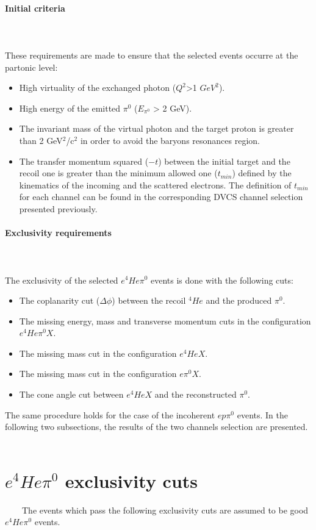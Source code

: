 \paragraph{Initial criteria}
~\\
~\\
These requirements are made to ensure that the selected events occurre at the partonic level:
\begin{itemize}
\item High virtuality of the exchanged photon ($Q^{2}$>1 $GeV^{2}$).
\item High energy of the emitted $\pi^{0}$ ($E_{\pi^{0}}$ > 2 GeV).
\item The invariant mass of the virtual photon and the target proton is greater than 2 GeV$^{2}$/c$^{2}$ in order to avoid the baryons resonances region.
\item The transfer momentum squared ($-t$) between the initial target and the recoil one is greater than the minimum allowed one ($t_{min}$) defined by the kinematics of the incoming and the scattered electrons. The definition of $t_{min}$ for each channel can be found in the corresponding DVCS channel selection presented previously.
\end{itemize}

\paragraph{Exclusivity requirements}
~\\
~\\The exclusivity of the selected $e^{4}He\pi^{0}$ events is done with the following cuts:
\begin{itemize}
\item The coplanarity cut ($\Delta \phi$) between the recoil $^{4}He$ and the produced $\pi^{0}$.
\item The missing energy, mass and transverse momentum cuts in the configuration $e^{4}He\pi^{0}X$.
\item The missing mass cut in the configuration $e^{4}HeX$.
\item The missing mass cut in the configuration $e\pi^{0}X$.
\item The cone angle cut between $e^{4}HeX$ and the reconstructed $\pi^{0}$.
\end{itemize}
  The same procedure holds for the case of the incoherent $ep\pi^{0}$ events. In the following two subsections, the results of the two channels selection are presented.
~\newpage
\section{$e^{4}He\pi^{0}$ exclusivity cuts}
~~~~The events which pass the following exclusivity cuts are assumed to be good $e^{4}He\pi^{0}$ events.

